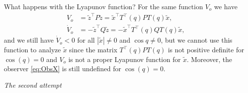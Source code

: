 What happens with the Lyapunov function? For the same function $V_o$ we have
\[
	\begin{aligned}
		V_o &= \tilde{z}^\top P \tilde{z} = \tilde{x}^\top T^\top(q)PT(q) \tilde{x}, \\
		\dot{V}_o &= - \tilde{z}^\top Q \tilde{z} = -\tilde{x}^\top T^\top(q)QT(q) \tilde{x},
	\end{aligned}
\]
and we still have $\dot{V}_o<0$ for all $|\tilde{x}|\ne 0$ and $\cos{q}\ne 0$, but we cannot use this function to analyze $\tilde{x}$ since the matrix $T^\top(q)PT(q)$ is not positive definite for $\cos(q)=0$ and $V_o$ is not a proper Lyapunov function for $\tilde{x}$. Moreover, the observer \eqref{eq:ObsX} is still undefined for $\cos(q)=0$.

\bigskip

\noindent\emph{The second attempt}

